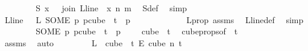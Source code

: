 \begin{isabellebody}
\ \ \ \ \ \isamarkupfalse%
\ \isamarkupfalse%
\ {\isachardoublequoteopen}{\isasymchi}S\ x\ {\isacharequal}{\kern0pt}\ {\isasymchi}\ {\isacharparenleft}{\kern0pt}join\ {\isacharparenleft}{\kern0pt}L{\isacharunderscore}{\kern0pt}line\ {}{\isacharparenright}{\kern0pt}\ x\ n\ m{\isacharparenright}{\kern0pt}{\isachardoublequoteclose}\ \isamarkupfalse%
\ {\isasymchi}S{\isacharunderscore}{\kern0pt}def\ \isamarkupfalse%
\ simp\isanewline
\ \ \ \ \ \isamarkupfalse%
\ \isamarkupfalse%
\ {\isachardoublequoteopen}L{\isacharunderscore}{\kern0pt}line\ {}\ {\isacharequal}{\kern0pt}\ L\ {\isacharparenleft}{\kern0pt}SOME\ p{\isachardot}{\kern0pt}\ p{\isasymin}cube\ {}\ {\isacharparenleft}{\kern0pt}t{\isacharplus}{\kern0pt}{}{\isacharparenright}{\kern0pt}\ {\isasymand}\ p\ {}\ {\isacharequal}{\kern0pt}\ {}{\isacharparenright}{\kern0pt}{\isachardoublequoteclose}\ \isanewline
\ \ \ \ \ \ \ \isamarkupfalse%
\ L{\isacharunderscore}{\kern0pt}prop\ assms{\isacharparenleft}{\kern0pt}{}{\isacharparenright}{\kern0pt}\ \isamarkupfalse%
\ L{\isacharunderscore}{\kern0pt}line{\isacharunderscore}{\kern0pt}def\ \isamarkupfalse%
\ simp\isanewline
\ \ \ \ \ \isamarkupfalse%
\ \isamarkupfalse%
\ {\isachardoublequoteopen}{\isacharparenleft}{\kern0pt}SOME\ p{\isachardot}{\kern0pt}\ p{\isasymin}cube\ {}\ {\isacharparenleft}{\kern0pt}t{\isacharplus}{\kern0pt}{}{\isacharparenright}{\kern0pt}\ {\isasymand}\ p\ {}\ {\isacharequal}{\kern0pt}\ {}{\isacharparenright}{\kern0pt}\ {\isasymin}\ cube\ {}\ {\isacharparenleft}{\kern0pt}t{\isacharplus}{\kern0pt}{}{\isacharparenright}{\kern0pt}{\isachardoublequoteclose}\ \isamarkupfalse%
\ cube{\isacharunderscore}{\kern0pt}props{\isacharparenleft}{\kern0pt}{}{\isacharparenright}{\kern0pt}{\isacharbrackleft}{\kern0pt}of\ {}\ {\isachardoublequoteopen}t{\isacharplus}{\kern0pt}{}{\isachardoublequoteclose}{\isacharbrackright}{\kern0pt}\ \isanewline
\ \ \ \ \ \ \ \isamarkupfalse%
\ assms{\isacharparenleft}{\kern0pt}{}{\isacharparenright}{\kern0pt}\ \isamarkupfalse%
\ auto\isanewline
\ \ \ \ \ \isamarkupfalse%
\ \isamarkupfalse%
\ {\isachardoublequoteopen}L\ {\isasymin}\ cube\ {}\ {\isacharparenleft}{\kern0pt}t{\isacharplus}{\kern0pt}{}{\isacharparenright}{\kern0pt}\ {\isasymrightarrow}\isactrlsub E\ cube\ n\ {\isacharparenleft}{\kern0pt}t{\isacharplus}{\kern0pt}{}{\isacharparenright}{\kern0pt}{\isachardoublequoteclose}\ \isanewline

\end{isabellebody}
